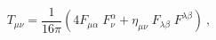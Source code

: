\begin{equation} 
\label{hs1} 
T_{\mu \nu}=\frac{1}{16\pi}\left( 
4F_{\mu \alpha}\;F_{\nu}^{\alpha}+ 
\eta _{\mu \nu}\;F_{\lambda \beta}\;F^{\lambda \beta} 
\right)~, 
\end{equation} 
